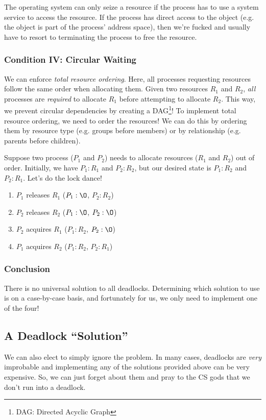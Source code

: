 \documentclass{report}
\newcommand{\asideBegin}[1]{\begin{tcolorbox}[colback=orange!5!white,colframe=black!75!orange,title={Aside:
      #1}]}
\newcommand{\asideEnd}{\end{tcolorbox}}
\begin{document}
\asideBegin{Seizing Resources}
The operating system can only seize a resource if the process has to use a system service to access
the resource. If the process has direct access to the object (e.g. the object is part of the
process' address space), then we're fucked and usually have to resort to terminating the process to
free the resource.
\asideEnd


\subsubsection{Condition IV: Circular Waiting}
We can enforce \textit{total resource ordering}. Here, all processes requesting resources follow the
same order when allocating them. Given two resources $R_1$ and $R_2$, \textit{all} processes are
\textit{required} to allocate $R_1$ before attempting to allocate $R_2$. This way, we prevent
circular dependencies by creating a DAG\footnote{DAG: Directed Acyclic Graph}! To implement total
resource ordering, we need to order the resources! We can do this by ordering them by resource type
(e.g. groups before members) or by relationship (e.g. parents before children).

\asideBegin{The Lock Dance}
Suppose two process ($P_1$ and $P_2$) needs to allocate resources ($R_1$ and $R_2$) out of
order. Initially, we have $P_1: R_1$ and $P_2: R_2$, but our desired state is $P_1: R_2$ and $P_2:
R_1$. Let's do the lock dance!

\begin{enumerate}[label=\textit{(\roman*)}]
\item $P_1$ releases $R_1$ ($P_1:\O$, $P_2: R_2$)
\item $P_2$ releases $R_2$ ($P_1:\O$, $P_2: \O$)
\item $P_2$ acquires $R_1$ ($P_1: R_2$, $P_2: \O$)
\item $P_1$ acquires $R_2$ ($P_1: R_2$, $P_2: R_1$)
\end{enumerate}
\asideEnd


\subsubsection{Conclusion}
There is no universal solution to all deadlocks. Determining which solution to use is on a
case-by-case basis, and fortunately for us, we only need to implement one of the four!


\subsection{A Deadlock ``Solution''}
We can also elect to simply ignore the problem. In many cases, deadlocks are \textit{very}
improbable and implementing any of the solutions provided above can be very expensive. So, we can
just forget about them and pray to the CS gods that we don't run into a deadlock.
\end{document}
